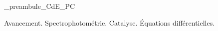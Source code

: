 

\ifdefined\mainIsLoaded\else
\RequirePackage{import}
{_preambule_CdE_PC}

\fi




\debutFicheEntrainement                                                                      %




\begin{prerequis}
	Avancement. Spectrophotométrie. Catalyse. Équations différentielles.
\end{prerequis}




